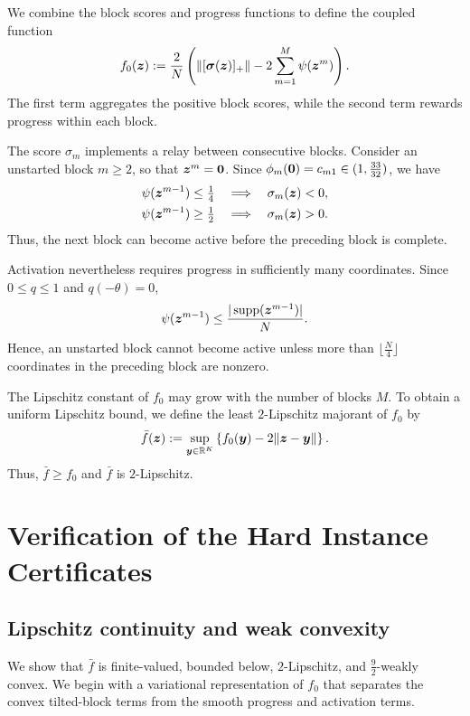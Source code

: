 We combine the block scores and progress functions to define
the coupled function
\begin{equation}
 \label{eq:hard}
 f_0(\bm{z})
 :=
 \frac2N
 \left(
   \|[\boldsymbol{\sigma}(\bm{z})]_+\|
   -
   2\sum_{m=1}^M\psi(\bm{z}^m)
 \right).
\end{equation}
The first term aggregates the positive block scores,
while the second term rewards progress within each block.
\begin{remark}
\label{rem:block-relay}
The score $\sigma_m$ implements a relay between consecutive
blocks. Consider an unstarted block $m\ge2$, so that
$\bm{z}^m={\mathbf 0}$. Since $\phi_m({\mathbf 0})=c_{m1}\in(1,\tfrac{33}{32})$,
we have
\[
 \begin{aligned}
 \psi(\bm{z}^{m-1})\le\tfrac14
 &\quad\Longrightarrow\quad \sigma_m(\bm{z})<0,\\
 \psi(\bm{z}^{m-1})\ge\tfrac12
 &\quad\Longrightarrow\quad \sigma_m(\bm{z})>0.
 \end{aligned}
\]
Thus, the next block can become active before the
preceding block is complete.

Activation nevertheless requires progress in sufficiently
many coordinates. Since $0\le q\le1$ and $q(-\theta)=0$,
\[
 \psi(\bm{z}^{m-1})
 \le \frac{|\operatorname{supp}(\bm{z}^{m-1})|}{N}.
\]
Hence, an unstarted block cannot become active unless
more than $\lfloor \tfrac{N}{4}\rfloor$ coordinates in the
preceding block are nonzero.
\end{remark}
The Lipschitz constant of $f_0$ may grow with the number
of blocks $M$. To obtain a uniform Lipschitz bound,
we define the least $2$-Lipschitz majorant of $f_0$ by
\begin{equation}
 \bar f(\bm{z})
 :=
 \sup_{\bm{y}\in{\mathbb{R}}^K}
 \left\{f_0(\bm{y})-2\|\bm{z}-\bm{y}\|\right\}.
 \label{newrand:majorant}
\end{equation}
Thus, $\bar f\ge f_0$ and $\bar f$ is $2$-Lipschitz.


\section{Verification of the Hard Instance Certificates}
\label{sec:verification}
\subsection{Lipschitz continuity and weak convexity}
\label{subsec:regularity} 
We show that $\bar f$ is finite-valued, bounded below,
$2$-Lipschitz, and $\tfrac92$-weakly convex.
We begin with a variational representation of $f_0$
that separates the convex tilted-block terms from
the smooth progress and activation terms.

